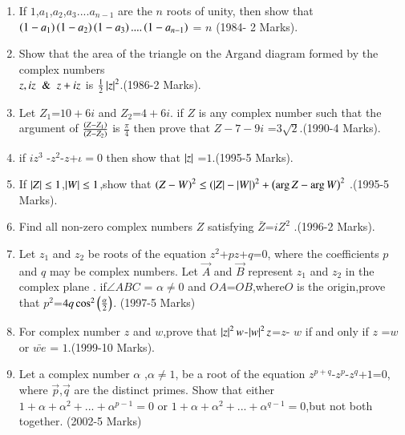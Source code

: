 \documentclass[journal]{IEEEtran}
\begin{document}
\begin{enumerate}[start=7] %
\item If $1$,$a_1$,$a_2$,$a_3$....$a_{n-1}$ are the $n$  roots of unity, then show that $\left(1-a_1\right)\left(1-a_2\right)\left(1-a_3\right)....\left(1-a_{n-1}\right)$ = $n$ \hfill (1984- 2 Marks).\\
\item Show that the area of the triangle on the Argand diagram formed by the complex  numbers\\
$z,  iz \And z+  iz$ is $\frac{1}{2}\left\vert z\right\vert^2$.\hfill (1986-2 Marks).\\
\item Let $Z_1$=$10+6i$ and $Z_2$=$4+6i$. if $Z$ is any complex number such that the argument of ${\frac{\left(Z-Z_1\right)}{\left(Z-Z_2
\right)}}$ is  ${\frac{\pi}{4}}$ then prove that $Z-7-9i$ =$3\sqrt{2}$.\hfill(1990-4 Marks).\\
\item if {$iz^{3}$ -$z^2$-$z$+$\iota=0$} then show that $\left\vert z\right\vert$ =$1$.\hfill(1995-5 Marks).\\
\item If $\left\vert Z\right\vert\le1$,$\left\vert W\right\vert\le1$,show that $\left(Z-W\right)^2\le\left(\left\vert Z\right\vert-\left\vert W\right\vert\right)^2+\left(\arg Z-\arg W\right)^2$ .\hfill(1995-5 Marks). \\
\item Find all non-zero complex numbers $Z$ satisfying $\bar Z$=$ iZ^2 $ .\hfill(1996-2 Marks).\\
\item Let $z_1$  and $z_2$ be roots of the equation $z^2$+$pz$+$q$=$0$, where the coefficients $p$ and $q$ may be complex numbers. Let $\Vec{A}$ and $\Vec{B}$ represent $z_1$ and $z_2$ in the complex plane . if$\angle ABC$ = $\alpha \not=0$ and $OA$=$OB$,where$O$ is the origin,prove that $p^2$=$4q\cos^2\left(\frac{\alpha}{2}\right)$. \hfill(1997-5 Marks)\\
\item For complex number $z$ and $w$,prove that $\left\vert z\right\vert^2w$-$\left\vert w\right\vert^2z$=$z$- $w$  if and only if $z$ =$w$ or $\bar{we} $ = $1$.\hfill(1999-10 Marks).\\
\item Let a complex number $\alpha$ ,$\alpha \not=1$, be a root of the equation $z^{p+q}$-$z^p$-$z^q$+$1$=$0$, where $\Vec{p}$,$\Vec{q}$ are the distinct primes. Show that either $1+\alpha+\alpha^2+...+\alpha^{p-1}=0$ or $1+\alpha+\alpha^2+...+\alpha^{q- 1}=0$,but not both together. \hfill(2002-5 Marks)\\

\end{enumerate}
\end{document}
